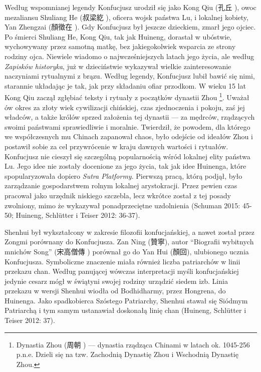 Według wspomnianej legendy Konfucjusz urodził się jako Kong Qiu (孔丘 ), owoc mezaliansu Shuliang He (叔梁紇 ), oficera wojsk państwa Lu, i lokalnej kobiety, Yan Zhengzai (顏徵在 ).
Gdy Konfucjusz był jeszcze dzieckiem, zmarł jego ojciec.
Po śmierci Shuliang He, Kong Qiu, tak jak Huineng, dorastał w ubóstwie, wychowywany przez samotną matkę, bez jakiegokolwiek wsparcia ze strony rodziny ojca.
Niewiele wiadomo o najwcześniejszych latach jego życia, ale według \textit{Zapisków historyka}, już w dzieciństwie wykazywał wielkie zainteresowanie naczyniami rytualnymi z brązu.
Według legendy, Konfucjusz lubił bawić się nimi, starannie układając je tak, jak przy składaniu ofiar przodkom.
W wieku 15 lat Kong Qiu zaczął zgłębiać teksty i rytuały z początków dynastii Zhou%
\footnote{Dynastia Zhou (周朝 ) --- dynastia rządząca Chinami w latach ok. 1045-256 p.n.e. Dzieli się na tzw. Zachodnią Dynastię Zhou i Wschodnią Dynastię Zhou.}.
Uważał ów okres za złoty wiek cywilizacji chińskiej, czas zjednoczenia i pokoju, zaś jej władców, a także królów sprzed założenia tej dynastii --- za mędrców, rządzących swoimi państwami sprawiedliwie i moralnie.
Twierdził, że powodem, dla którego we współczesnych mu Chinach zapanował chaos, było odejście od ideałów Zhou i postawił sobie za cel przywrócenie w kraju dawnych wartości i rytuałów.
Konfucjusz nie cieszył się szczególną popularnością wśród lokalnej elity państwa Lu.
Jego idee nie zostały docenione za jego życia, tak jak idee Huinenga, które spopularyzowała dopiero \textit{Sutra Platformy}.
Pierwszą pracą, którą podjął, było zarządzanie gospodarstwem rolnym lokalnej arystokracji.
Przez pewien czas pracował jako urzędnik niskiego szczebla, lecz wkrótce został z tej posady zwolniony, mimo że wykazywał ponadprzeciętne uzdolnienia
(Schuman 2015: 45-50; Huineng, Schlütter i Teiser 2012: 36-37).

Shenhui był wykształcony w zakresie filozofii konfucjańskiej, a nawet został przez Zongmi porównany do Konfucjusza. Zan Ning (贊寧), autor ``Biografii wybitnych mnichów Song'' (宋高僧傳 ) porównał go do Yan Hui (顏回), ulubionego ucznia Konfucjusza.
Symboliczne znaczenie miała również liczba patriarchów w linii przekazu chan. Według panującej wówczas interpretacji myśli konfucjańskiej jedynie cesarz mógł w świątyni swojej rodziny urządzić siedem izb.
Linia przekazu w wersji Shenhui wiodła od Bodhidharmy, przez Hongrena, do Huinenga.
Jako spadkobierca Szóstego Patriarchy, Shenhui stawał się Siódmym Patriarchą i tym samym ustanawiał doskonałą linię chan
(Huineng, Schlütter i Teiser 2012: 37).

